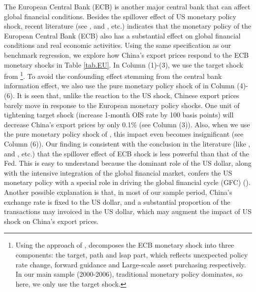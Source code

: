 The European Central Bank (ECB) is another major central bank that can affect global financial conditions. Besides the spillover effect of US monetary policy shock, recent literature (see \cite{ca2020monetary}, \cite{corsetti2021exchange} and \cite{miranda2022tale}, etc.) indicates that the monetary policy of the European Central Bank (ECB) also has a substantial effect on global financial conditions and real economic activities. Using the same specification as our benchmark regression, we explore how China's export prices respond to the ECB monetary shocks in Table \ref{tab.EU}. In Column (1)-(3), we use the target shock from \cite{miranda2022tale} \footnote{Using the approach of \cite{swanson2021measuring}, \cite{miranda2022tale} decomposes the ECB monetary shock into three components: the target, path and lsap part, which reflects unexpected policy rate change, forward guidance and Large-scale asset purchasing respectively. In our main sample (2000-2006), traditional monetary policy dominates, so here, we only use the target shock.}. To avoid the confounding effect stemming from the central bank information effect, we also use the pure monetary policy shock of \cite{jarocinski2020deconstructing} in Column (4)-(6). It is seen that, unlike the reaction to the US shock, Chinese export prices barely move in response to the European monetary policy shocks. One unit of tightening target shock (increase 1-month OIS rate by 100 basis points) will decrease China's export prices by only 0.1$\%$ (see Column (3)). Also, when we use the pure monetary policy shock of \cite{jarocinski2020deconstructing}, this impact even becomes insignificant (see Column (6)). Our finding is consistent with the conclusion in the literature (like \cite{ca2020monetary}, \cite{corsetti2021exchange} and \cite{miranda2022tale}, etc.) that the spillover effect of ECB shock is less powerful than that of the Fed. This is easy to understand because the dominant role of the US dollar, along with the intensive integration of the global financial market, confers the US monetary policy with a special role in driving the global financial cycle (GFC) (\cite{miranda2020us}). Another possible explanation is that, in most of our sample period, China's exchange rate is fixed to the US dollar, and a substantial proportion of the transactions may invoiced in the US dollar, which may augment the impact of US shock on China's export prices. 

